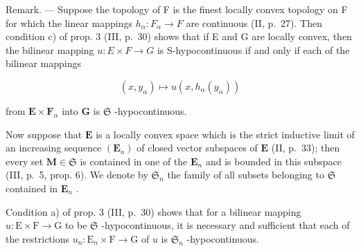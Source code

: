 Remark. --- Suppose the topology of F is the finest locally convex topology on F for which the linear mappings \(h_{\alpha}:F_{\alpha}\to F\) are continuous (II, p.~27). Then condition c) of prop. 3 (III, p.~30) shows that if E and G are locally convex, then the bilinear mapping \(u:E\times F\to G\) is S-hypocontinuous if and only if each of the bilinear mappings

\[
(x, y _ {\alpha}) \mapsto u (x, h _ {\alpha} (y _ {\alpha}))
\]

from \(\mathbf{E} \times \mathbf{F}_{\alpha}\) into \(\mathbf{G}\) is \(\mathfrak{S}\) -hypocontinuous.

Now suppose that \(\mathbf{E}\) is a locally convex space which is the strict inductive limit of an increasing sequence \((\mathbf{E}_n)\) of closed vector subspaces of \(\mathbf{E}\) (II, p.~33); then every set \(\mathbf{M} \in \mathfrak{S}\) is contained in one of the \(\mathbf{E}_n\) and is bounded in this subspace (III, p.~5, prop. 6). We denote by \(\mathfrak{S}_n\) the family of all subsets belonging to \(\mathfrak{S}\) contained in \(\mathbf{E}_n\) .

Condition a) of prop. 3 (III, p.~30) shows that for a bilinear mapping \(u: \mathrm{E} \times \mathrm{F} \to \mathrm{G}\) to be \(\mathfrak{S}\) -hypocontinuous, it is necessary and sufficient that each of the restrictions \(u_n: \mathrm{E}_n \times \mathrm{F} \to \mathrm{G}\) of \(u\) is \(\mathfrak{S}_n\) -hypocontinuous.


